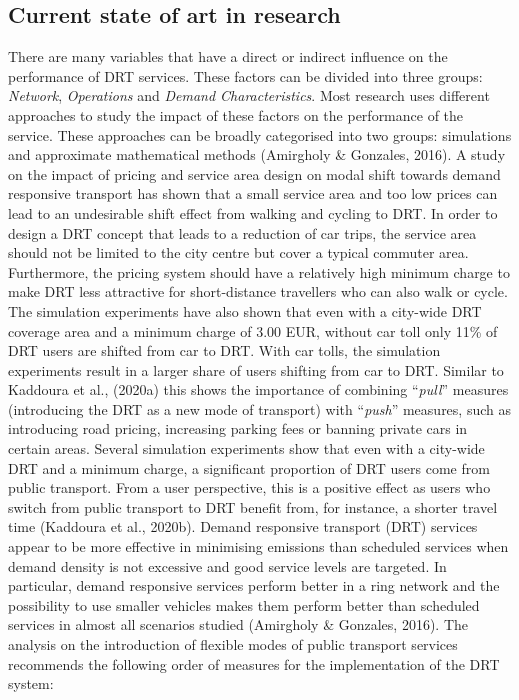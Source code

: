 \documentclass[
]{book}
\begin{document}
\hypertarget{current-state-of-art-in-research-36}{%
\subsection*{Current state of art in research}\label{current-state-of-art-in-research-36}}

There are many variables that have a direct or indirect influence on the performance of DRT services. These factors can be divided into three groups: \emph{Network}, \emph{Operations} and \emph{Demand Characteristics}. Most research uses different approaches to study the impact of these factors on the performance of the service. These approaches can be broadly categorised into two groups: simulations and approximate mathematical methods (Amirgholy \& Gonzales, 2016).
A study on the impact of pricing and service area design on modal shift towards demand responsive transport has shown that a small service area and too low prices can lead to an undesirable shift effect from walking and cycling to DRT. In order to design a DRT concept that leads to a reduction of car trips, the service area should not be limited to the city centre but cover a typical commuter area. Furthermore, the pricing system should have a relatively high minimum charge to make DRT less attractive for short-distance travellers who can also walk or cycle. The simulation experiments have also shown that even with a city-wide DRT coverage area and a minimum charge of 3.00 EUR, without car toll only 11\% of DRT users are shifted from car to DRT. With car tolls, the simulation experiments result in a larger share of users shifting from car to DRT. Similar to Kaddoura et al., (2020a) this shows the importance of combining ``\emph{pull}'' measures (introducing the DRT as a new mode of transport) with ``\emph{push}'' measures, such as introducing road pricing, increasing parking fees or banning private cars in certain areas. Several simulation experiments show that even with a city-wide DRT and a minimum charge, a significant proportion of DRT users come from public transport. From a user perspective, this is a positive effect as users who switch from public transport to DRT benefit from, for instance, a shorter travel time (Kaddoura et al., 2020b).
Demand responsive transport (DRT) services appear to be more effective in minimising emissions than scheduled services when demand density is not excessive and good service levels are targeted. In particular, demand responsive services perform better in a ring network and the possibility to use smaller vehicles makes them perform better than scheduled services in almost all scenarios studied (Amirgholy \& Gonzales, 2016).
The analysis on the introduction of flexible modes of public transport services recommends the following order of measures for the implementation of the DRT system:
\end{document}

